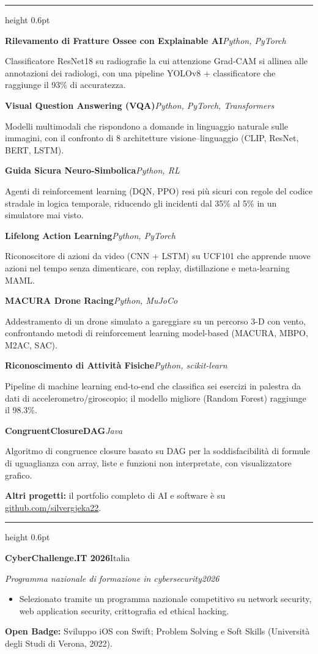 \documentclass[a4paper,11pt]{article}
\newcommand{\cvsec}[1]{\vspace{7pt}{\large\scshape #1}\par\vspace{1.5pt}\hrule height 0.6pt\vspace{5pt}}
\newcommand{\cventry}[4]{\textbf{#1}\hfill #2\par\textit{#3}\hfill\textit{#4}\par\vspace{1pt}}
\newcommand{\proj}[3]{\textbf{#1}\hfill\textit{#3}\par #2\par\smallskip}
\begin{document}
\cvsec{Progetti}

\proj{Rilevamento di Fratture Ossee con Explainable AI}{Classificatore ResNet18 su radiografie la cui attenzione Grad-CAM si allinea alle annotazioni dei radiologi, con una pipeline YOLOv8 + classificatore che raggiunge il 93\% di accuratezza.}{Python, PyTorch}
\proj{Visual Question Answering (VQA)}{Modelli multimodali che rispondono a domande in linguaggio naturale sulle immagini, con il confronto di 8 architetture visione--linguaggio (CLIP, ResNet, BERT, LSTM).}{Python, PyTorch, Transformers}
\proj{Guida Sicura Neuro-Simbolica}{Agenti di reinforcement learning (DQN, PPO) resi più sicuri con regole del codice stradale in logica temporale, riducendo gli incidenti dal 35\% al 5\% in un simulatore mai visto.}{Python, RL}
\proj{Lifelong Action Learning}{Riconoscitore di azioni da video (CNN + LSTM) su UCF101 che apprende nuove azioni nel tempo senza dimenticare, con replay, distillazione e meta-learning MAML.}{Python, PyTorch}
\proj{MACURA Drone Racing}{Addestramento di un drone simulato a gareggiare su un percorso 3-D con vento, confrontando metodi di reinforcement learning model-based (MACURA, MBPO, M2AC, SAC).}{Python, MuJoCo}
\proj{Riconoscimento di Attività Fisiche}{Pipeline di machine learning end-to-end che classifica sei esercizi in palestra da dati di accelerometro/giroscopio; il modello migliore (Random Forest) raggiunge il 98.3\%.}{Python, scikit-learn}
\proj{CongruentClosureDAG}{Algoritmo di congruence closure basato su DAG per la soddisfacibilità di formule di uguaglianza con array, liste e funzioni non interpretate, con visualizzatore grafico.}{Java}

\textbf{Altri progetti:} il portfolio completo di AI e software è su \href{https://github.com/silvergjeka22}{github.com/silvergjeka22}.

\cvsec{Riconoscimenti \& Formazione}

\cventry{CyberChallenge.IT 2026}{Italia}{Programma nazionale di formazione in cybersecurity}{2026}
\begin{itemize}
  \item Selezionato tramite un programma nazionale competitivo su network security, web application security, crittografia ed ethical hacking.
\end{itemize}

\textbf{Open Badge:} Sviluppo iOS con Swift; Problem Solving e Soft Skills (Università degli Studi di Verona, 2022).
\end{document}
